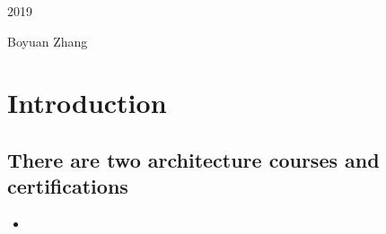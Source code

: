 \begin{titlepage}
 \vspace{0.5\baselineskip} %

 \textit{} %

 \vfill %



 \vspace{0.3\baselineskip} %

 2019 %

  {\large Boyuan Zhang} %

\end{titlepage}


\newpage




\tableofcontents


\chapter{Introduction}

\section{There are two architecture courses and certifications}

\begin{itemize}
	\item 
\end{itemize}

